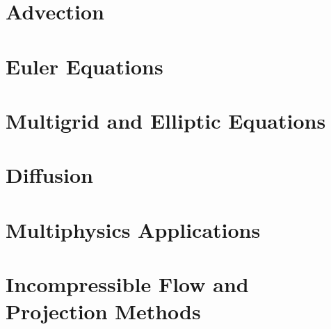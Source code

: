 \documentclass[11pt]{book}
\begin{document}
\chapter{Advection}




\chapter{Euler Equations}




\chapter{Multigrid and Elliptic Equations}




\chapter{Diffusion}




\chapter{Multiphysics Applications}



\chapter{Incompressible Flow and Projection Methods}



\backmatter




\end{document}
